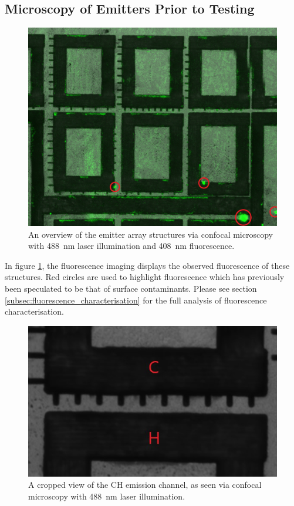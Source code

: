 \begin{refsection}
\subsection{Microscopy of Emitters Prior to Testing}
\begin{figure}[H]
    \centering
    \includegraphics[width=\linewidth]{Chapter7/Figs/Raster/emitter_overview_fl.jpg}
    \caption{An overview of the emitter array structures via confocal microscopy with 488~\si{\nano\metre} laser illumination and 408~\si{\nano\metre} fluorescence.}
    \label{fig:emitter_fl}
\end{figure}

In figure \ref{fig:emitter_fl}, the fluorescence imaging displays the observed fluorescence of these structures. Red circles are used to highlight fluorescence which has previously been speculated to be that of surface contaminants. Please see section \ref{subsec:fluorescence_characterisation} for the full analysis of fluorescence characterisation.

\begin{figure}[H]
    \centering
    \includegraphics[width=\linewidth]{Chapter7/Figs/Raster/ch_channel_esid.jpg}
    \caption{A cropped view of the CH emission channel, as seen via confocal microscopy with 488~\si{\nano\metre} laser illumination.}
    \label{fig:ch_esid}
\end{figure}


\end{refsection}
